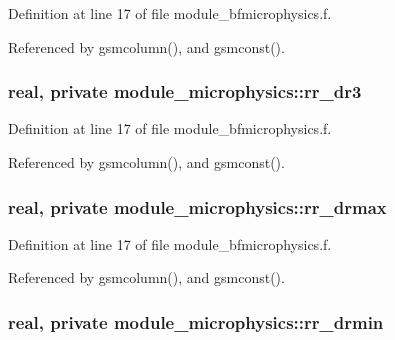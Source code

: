 Definition at line 17 of file module\+\_\+bfmicrophysics.\+f.



Referenced by gsmcolumn(), and gsmconst().

\subsubsection[{\texorpdfstring{rr\+\_\+dr3}{rr_dr3}}]{\setlength{\rightskip}{0pt plus 5cm}real, private module\+\_\+microphysics\+::rr\+\_\+dr3\hspace{0.3cm}{\ttfamily [private]}}\hypertarget{namespacemodule__microphysics_afbed7ecd787abc8db3c7ff6160412fa1}{}\label{namespacemodule__microphysics_afbed7ecd787abc8db3c7ff6160412fa1}


Definition at line 17 of file module\+\_\+bfmicrophysics.\+f.



Referenced by gsmcolumn(), and gsmconst().

\subsubsection[{\texorpdfstring{rr\+\_\+drmax}{rr_drmax}}]{\setlength{\rightskip}{0pt plus 5cm}real, private module\+\_\+microphysics\+::rr\+\_\+drmax\hspace{0.3cm}{\ttfamily [private]}}\hypertarget{namespacemodule__microphysics_af631f5533a9284cf93087bb35396a9de}{}\label{namespacemodule__microphysics_af631f5533a9284cf93087bb35396a9de}


Definition at line 17 of file module\+\_\+bfmicrophysics.\+f.



Referenced by gsmcolumn(), and gsmconst().

\subsubsection[{\texorpdfstring{rr\+\_\+drmin}{rr_drmin}}]{\setlength{\rightskip}{0pt plus 5cm}real, private module\+\_\+microphysics\+::rr\+\_\+drmin\hspace{0.3cm}{\ttfamily [private]}}\hypertarget{namespacemodule__microphysics_a6f0adb81dca26899ff77f0a454206559}{}\label{namespacemodule__microphysics_a6f0adb81dca26899ff77f0a454206559}


